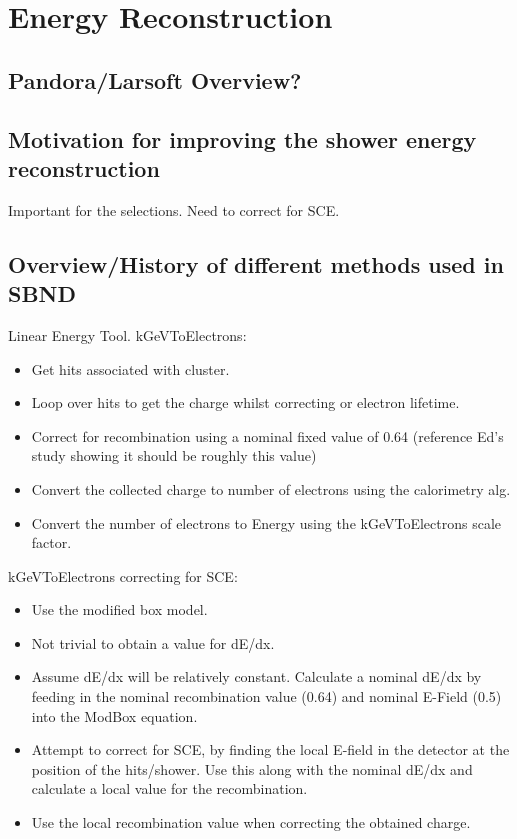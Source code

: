 \chapter{Energy Reconstruction}
\label{chap:Energy Reco}

\section{Pandora/Larsoft Overview?}

\section{Motivation for improving the shower energy reconstruction}
Important for the selections. 
Need to correct for SCE.
\section{Overview/History of different methods used in SBND}
Linear Energy Tool. \newline
kGeVToElectrons:
\begin{itemize}
    \item Get hits associated with cluster.
    \item Loop over hits to get the charge whilst correcting or electron lifetime.
    \item Correct for recombination using a nominal fixed value of 0.64 (reference Ed's study showing it should be roughly this value) 
    \item Convert the collected charge to number of electrons using the calorimetry alg.
    \item Convert the number of electrons to Energy using the kGeVToElectrons scale factor. 
\end{itemize}
kGeVToElectrons correcting for SCE:
\begin{itemize}
    \item Use the modified box model.
    \item Not trivial to obtain a value for dE/dx.
    \item Assume dE/dx will be relatively constant. Calculate a nominal dE/dx by feeding in the nominal recombination value (0.64) and nominal E-Field (0.5) into the ModBox equation. 
    \item Attempt to correct for SCE, by finding the local E-field in the detector at the position of the hits/shower. Use this along with the nominal dE/dx and calculate a local value for the recombination. 
    \item Use the local recombination value when correcting the obtained charge. 
\end{itemize}

